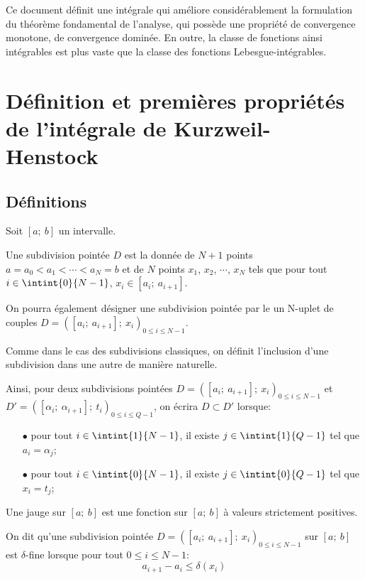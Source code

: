 Ce document définit une intégrale qui améliore considérablement la formulation du théorème fondamental de l'analyse, qui possède une propriété de convergence monotone, de convergence dominée. En outre, la classe de fonctions ainsi intégrables est plus vaste que la classe des fonctions Lebesgue-intégrables.

\section{Définition et premières propriétés de l'intégrale de Kurzweil-Henstock}

\subsection{Définitions}

\begin{de}
Soit $[a;~b]$ un intervalle.

\medskip
Une subdivision pointée $D$ est la donnée de $N+1$ points $a=a_0<a_1<\cdots<a_N=b$ et de $N$ points $x_1$, $x_2$, $\cdots$, $x_N$ tels que pour tout $i \in \intint{0}{N-1}$, $x_i \in [a_{i};~a_{i+1}]$.

\medskip
On pourra également désigner une subdivision pointée par le un N-uplet de couples $D=([a_i;~a_{i+1}];~x_i)_{0 \leq i \leq N-1}$.


\medskip
Comme dans le cas des subdivisions classiques, on définit l'inclusion d'une subdivision dans une autre de manière \og naturelle. \fg{}

Ainsi, pour deux subdivisions pointées $D=([a_i;~a_{i+1}];~x_i)_{0 \leq i \leq N-1}$ et $D'=([\alpha_i;~\alpha_{i+1}];~t_i)_{0 \leq i \leq Q-1}$, on écrira $D \subset D'$ lorsque:
\begin{itemize}
\item[$\bullet$]
pour tout $i \in \intint{1}{N-1}$, il existe $j \in \intint{1}{Q-1}$ tel que $a_i = \alpha_j$;
\item[$\bullet$]
pour tout $i \in \intint{0}{N-1}$, il existe $j \in \intint{0}{Q-1}$ tel que $x_i = t_j$;
\end{itemize}
\end{de}


\begin{de}
Une jauge sur $[a;~b]$ est une fonction sur $[a;~b]$ à valeurs strictement positives.

On dit qu'une subdivision pointée $D = ([a_i;~a_{i+1}];~x_i)_{0 \leq i \leq N-1}$ sur $[a;~b]$ est $\delta$-fine lorsque pour tout $0\leq i \leq N-1$:
\[
a_{i+1}-a_i \leq \delta(x_i)
\]
\end{de}


